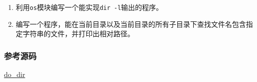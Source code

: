 \begin{enumerate}
\def\labelenumi{\arabic{enumi}.}
\item
  利用\texttt{os}模块编写一个能实现\texttt{dir\ -l}输出的程序。
\item
  编写一个程序，能在当前目录以及当前目录的所有子目录下查找文件名包含指定字符串的文件，并打印出相对路径。
\end{enumerate}

\hypertarget{ux53c2ux8003ux6e90ux7801}{%
\subsubsection{参考源码}\label{ux53c2ux8003ux6e90ux7801}}

\href{https://github.com/michaelliao/learn-python3/blob/master/samples/io/do_dir.py}{do\_dir}

